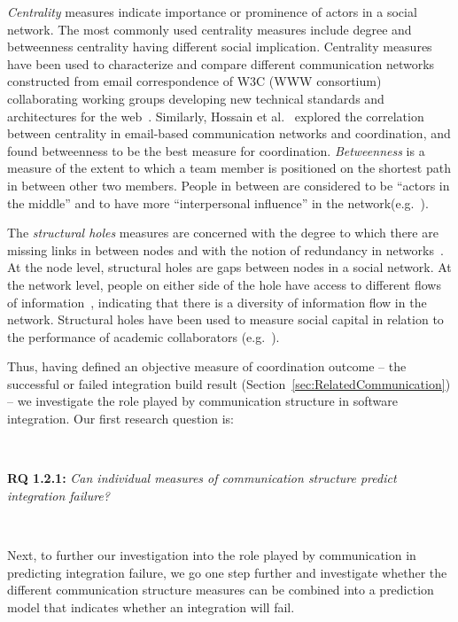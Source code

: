 \emph{Centrality} measures indicate importance or prominence of actors in a
social network. The most commonly used centrality measures include degree and
betweenness centrality having different social implication. Centrality measures
have been used to characterize and compare different communication networks
constructed from email correspondence of W3C (WWW consortium) collaborating
working groups developing new technical standards and architectures for the
web~\cite{Gloor:2003cikm}. Similarly, Hossain et al.~\cite{hossain:cscw:2006}
explored the correlation between centrality in email-based communication networks
and coordination, and found betweenness to be the best measure for coordination.
\emph{Betweenness} is a measure of the extent to which a team member is
positioned on the shortest path in between other two members. People in between
are considered to be ``actors in the middle'' and to have more ``interpersonal
influence'' in the
network(e.g.~\cite{Gloor:2003cikm,zimmermann:icse:2008,hossain:cscw:2006}).

The \emph{structural holes} measures are concerned with the degree to which there
are missing links in between nodes and with the notion of redundancy in
networks~\cite{Burt:1995vo}. At the node level, structural holes are gaps between
nodes in a social network. At the network level, people on either side of the
hole have access to different flows of information~\cite{Hargadon:1997asq},
indicating that there is a diversity of information flow in the network.
Structural holes have been used to measure social capital in relation to the
performance of academic collaborators (e.g.~\cite{Brambila:PICMET2007}).


Thus, having defined an objective measure of coordination outcome -- the
successful or failed integration build result
(Section~\ref{sec:RelatedCommunication}) -- we investigate the role played by
communication structure in software integration. Our first research question is:

\ \

\noindent\textbf{RQ 1.2.1:} \emph{Can individual measures of communication structure
predict integration failure?}

\ \

Next, to further our investigation into the role played by communication in
predicting integration failure, we go one step further and investigate whether
the different communication structure measures can be combined into a prediction
model that indicates whether an integration will fail.

